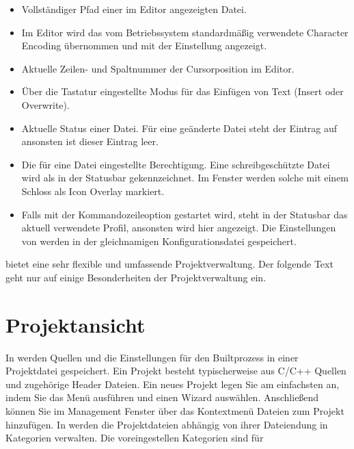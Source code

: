 \begin{itemize}
\item Vollständiger Pfad einer im Editor angezeigten Datei.
\item Im Editor wird das vom Betriebssystem standardmäßig verwendete Character Encoding übernommen und mit der Einstellung  angezeigt.
\item Aktuelle Zeilen- und Spaltnummer der Cursorposition im Editor.
\item Über die Tastatur eingestellte Modus für das Einfügen von Text (Insert oder Overwrite).
\item Aktuelle Status einer Datei. Für eine geänderte Datei steht der Eintrag auf  ansonsten ist dieser Eintrag leer.
\item Die für eine Datei eingestellte Berechtigung. Eine schreibgeschützte Datei wird als  in der Statusbar gekennzeichnet. Im Fenster  werden solche mit einem Schloss als Icon Overlay markiert.
\item Falls \codeblocks mit der Kommandozeileoption  gestartet wird, steht in der Statusbar das aktuell verwendete Profil, ansonsten wird hier  angezeigt. Die Einstellungen von \codeblocks werden in der gleichnamigen Konfigurationsdatei  gespeichert.
\end{itemize}

\codeblocks bietet eine sehr flexible und umfassende Projektverwaltung. Der folgende Text geht nur auf einige Besonderheiten der Projektverwaltung ein.

\section{Projektansicht}\label{sec:categories}

In \codeblocks werden Quellen und die Einstellungen für den Builtprozess in einer Projektdatei  gespeichert. Ein Projekt besteht typischerweise aus C/C++ Quellen und zugehörige Header Dateien. Ein neues Projekt legen Sie am einfachsten an, indem Sie das Menü  ausführen und einen Wizard auswählen. Anschließend können Sie im Management Fenster über das Kontextmenü  Dateien zum Projekt hinzufügen. In \codeblocks werden die Projektdateien abhängig von ihrer Dateiendung in Kategorien verwalten. Die voreingestellen Kategorien sind für

